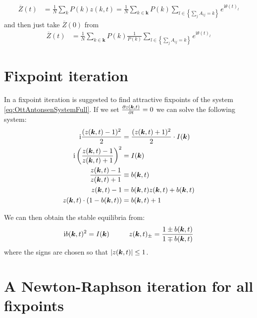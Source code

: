 \begin{align}
\overline{Z}(t) &= \frac{1}{N} \sum_{k} P(k) z(k, t) = \frac{1}{N} \sum_{k \in \boldsymbol{k}} P(k) \sum_{l \in \left\{\sum_j A_{ij} = k\right\}} e^{\mathrm{i}\theta(t)_l}
\end{align}
and then just take $\overline{Z}(0)$ from
\begin{align}
\overline{Z}(t) &= \frac{1}{N} \sum_{k \in \boldsymbol{k}} P(k) \frac{1}{P(k)}\sum_{l \in \left\{\sum_j A_{ij} = k\right\}} e^{\mathrm{i}\theta(t)_l}
\end{align}
    

\section{Fixpoint iteration}
In \cite{OttAntonsen2017} a fixpoint iteration is suggested to find attractive fixpoints of the system \eqref{eq:OttAntonsenSystemFull}. If we set $\frac{\partial z({\boldsymbol{k}}, t)}{\partial t} = 0$ we can solve the following system:
\begin{align}
{\rm{i}} \frac{(z({\boldsymbol{k}}, t)-1)^{2}}{2} &= \frac{(z({\boldsymbol{k}}, t)+1)^{2}}{2} \cdot I({\boldsymbol{k}}) \nonumber \\
{\rm{i}} \left(\frac{z({\boldsymbol{k}}, t)-1}{z({\boldsymbol{k}}, t)+1}\right)^2 &= I({\boldsymbol{k}}) \nonumber \\
\frac{z({\boldsymbol{k}}, t)-1}{z({\boldsymbol{k}}, t)+1} &\equiv b({\boldsymbol{k}},t) \nonumber \\
z({\boldsymbol{k}}, t) - 1 &= b({\boldsymbol{k}},t) z({\boldsymbol{k}}, t) + b({\boldsymbol{k}},t)  \nonumber \\
z({\boldsymbol{k}}, t) \cdot (1 - b({\boldsymbol{k}},t)) &= b({\boldsymbol{k}},t)  + 1\nonumber
\end{align}

We can then obtain the stable equilibria from:
\begin{align}
\ic b(\k,t)^2 = I(\k) \hspace{10mm} z(\k, t)_{\pm} = \frac{1 \pm b(\k,t)}{1 \mp b(\k,t)} \label{eq:fixedpointiterations} 
\end{align}
where the signs are chosen so that $\vert z({\boldsymbol{k}}, t) \vert \leq 1$.


\section{A Newton-Raphson iteration for all fixpoints}
